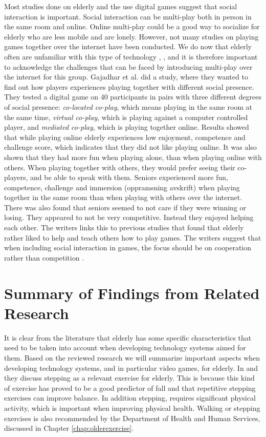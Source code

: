 Most studies done on elderly and the use digital games suggest that social interaction is important. Social interaction can be multi-play both in person in the same room and online. Online multi-play could be a good way to socialize for elderly who are less mobile and are lonely. However, not many studies on playing games together over the internet have been conducted. We do now that elderly often are unfamiliar with this type of technology \cite{Billis}, \cite{gregor}, and it is therefore important to acknowledge the challenges that can be faced by introducing multi-play over the internet for this group. Gajadhar et al. \cite{Gajadhar} did a study, where they wanted to find out how players experiences playing together with different social presence. They tested a digital game on 40 participants in pairs with three different degrees of social presence: \emph{co-located co-play}, which means playing in the same room at the same time, \emph{virtual co-play}, which is playing against a computer controlled player, and \emph{mediated co-play}, which is playing together online. Results showed that while playing online elderly experiences low enjoyment, competence and challenge score, which indicates that they did not like playing online. It was also shown that they had more fun when playing alone, than when playing online with others. When playing together with others, they would prefer seeing their co-players, and be able to speak with them. Seniors experienced more fun, competence, challenge and immersion (oppramsning avskrift) when playing together in the same room than when playing with others over the internet. There was also found that seniors seemed to not care if they were winning or losing. They appeared to not be very competitive.  Instead they enjoyed helping each other. The writers links this to previous studies that found that elderly rather liked to help and teach others how to play games. The writers suggest that when including social interaction in games, the focus should be on cooperation rather than competition \cite{Gajadhar}. 


\section{Summary of Findings from Related Research}
\label{sec:summaryguidelines}
It is clear from the literature that elderly has some specific characteristics that need to be taken into account when developing technology systems aimed for them. Based on the reviewed research we will summarize important aspects when developing technology systems, and in particular video games, for elderly. In \cite{bruin} and \cite{gerling2} they discuss stepping as a relevant exercise for elderly. This is because this kind of exercise has proved to be a good predictor of fall and that repetitive stepping exercises can improve balance. In addition stepping, requires significant physical activity, which is important when improving physical health. Walking or stepping exercises is also recommended by the Department of Health and Human Services, discussed in Chapter \ref{chap:olderexercise}.

